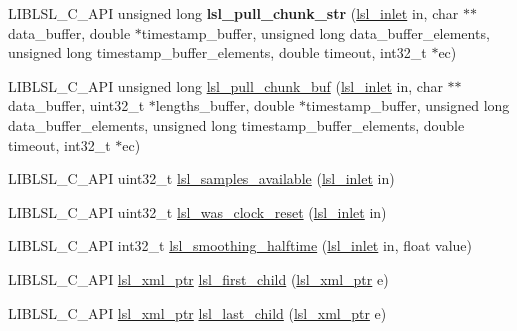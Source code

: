 \begin{DoxyCompactItemize}
\item 
\mbox{\label{namespacelsl_aeac6202687776ae5d0155226869237d0}} 
L\+I\+B\+L\+S\+L\+\_\+\+C\+\_\+\+A\+PI unsigned long {\bfseries lsl\+\_\+pull\+\_\+chunk\+\_\+str} (\hyperlink{namespacelsl_a884a3363cfcba75d7ce8f00c1c4c54f1}{lsl\+\_\+inlet} in, char $\ast$$\ast$data\+\_\+buffer, double $\ast$timestamp\+\_\+buffer, unsigned long data\+\_\+buffer\+\_\+elements, unsigned long timestamp\+\_\+buffer\+\_\+elements, double timeout, int32\+\_\+t $\ast$ec)
\item 
L\+I\+B\+L\+S\+L\+\_\+\+C\+\_\+\+A\+PI unsigned long \hyperlink{namespacelsl_a90d24057f9ba37f33d3539666af27082}{lsl\+\_\+pull\+\_\+chunk\+\_\+buf} (\hyperlink{namespacelsl_a884a3363cfcba75d7ce8f00c1c4c54f1}{lsl\+\_\+inlet} in, char $\ast$$\ast$data\+\_\+buffer, uint32\+\_\+t $\ast$lengths\+\_\+buffer, double $\ast$timestamp\+\_\+buffer, unsigned long data\+\_\+buffer\+\_\+elements, unsigned long timestamp\+\_\+buffer\+\_\+elements, double timeout, int32\+\_\+t $\ast$ec)
\item 
L\+I\+B\+L\+S\+L\+\_\+\+C\+\_\+\+A\+PI uint32\+\_\+t \hyperlink{namespacelsl_ab5511189be4bb2c887fd5e0bd0ab9b00}{lsl\+\_\+samples\+\_\+available} (\hyperlink{namespacelsl_a884a3363cfcba75d7ce8f00c1c4c54f1}{lsl\+\_\+inlet} in)
\item 
L\+I\+B\+L\+S\+L\+\_\+\+C\+\_\+\+A\+PI uint32\+\_\+t \hyperlink{namespacelsl_a3b98f7920895623517758ed1500bcad3}{lsl\+\_\+was\+\_\+clock\+\_\+reset} (\hyperlink{namespacelsl_a884a3363cfcba75d7ce8f00c1c4c54f1}{lsl\+\_\+inlet} in)
\item 
L\+I\+B\+L\+S\+L\+\_\+\+C\+\_\+\+A\+PI int32\+\_\+t \hyperlink{namespacelsl_a71b6f856d04b6519ab6b249499ad4e91}{lsl\+\_\+smoothing\+\_\+halftime} (\hyperlink{namespacelsl_a884a3363cfcba75d7ce8f00c1c4c54f1}{lsl\+\_\+inlet} in, float value)
\item 
L\+I\+B\+L\+S\+L\+\_\+\+C\+\_\+\+A\+PI \hyperlink{namespacelsl_a5edc7a49a1a1be1634fe6dce3d59c59b}{lsl\+\_\+xml\+\_\+ptr} \hyperlink{namespacelsl_a00b272ef8da2c1f1a6ea440219728c32}{lsl\+\_\+first\+\_\+child} (\hyperlink{namespacelsl_a5edc7a49a1a1be1634fe6dce3d59c59b}{lsl\+\_\+xml\+\_\+ptr} e)
\item 
L\+I\+B\+L\+S\+L\+\_\+\+C\+\_\+\+A\+PI \hyperlink{namespacelsl_a5edc7a49a1a1be1634fe6dce3d59c59b}{lsl\+\_\+xml\+\_\+ptr} \hyperlink{namespacelsl_aeb717da468fa8bfc541af78b59052e6d}{lsl\+\_\+last\+\_\+child} (\hyperlink{namespacelsl_a5edc7a49a1a1be1634fe6dce3d59c59b}{lsl\+\_\+xml\+\_\+ptr} e)
\item 

\end{DoxyCompactItemize}
